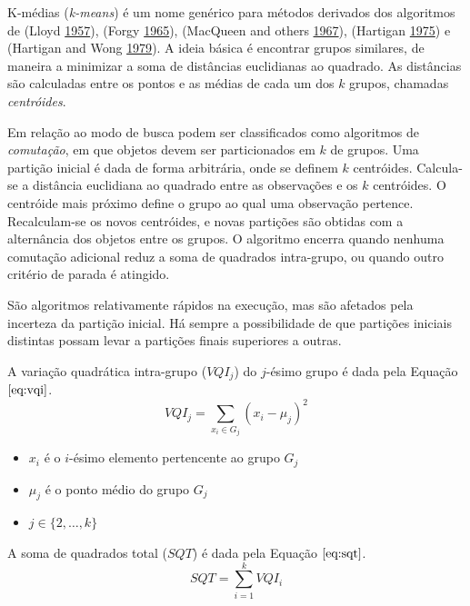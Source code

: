 \documentclass[
]{book}
\providecommand{\tightlist}{%
  \setlength{\itemsep}{0pt}\setlength{\parskip}{0pt}}
\theoremstyle{definition}
\theoremstyle{definition}
\theoremstyle{definition}
\theoremstyle{remark}
\begin{document}
K-médias (\emph{k-means}) é um nome genérico para métodos derivados dos algoritmos de (Lloyd \protect\hyperlink{ref-lloyd1982least}{1957}), (Forgy \protect\hyperlink{ref-forgy1965cluster}{1965}), (MacQueen and others \protect\hyperlink{ref-macqueen1967some}{1967}), (Hartigan \protect\hyperlink{ref-hartigan1975clustering}{1975}) e (Hartigan and Wong \protect\hyperlink{ref-hartigan1979algorithm}{1979}). A ideia básica é encontrar grupos similares, de maneira a minimizar a soma de distâncias euclidianas ao quadrado. As distâncias são calculadas entre os pontos e as médias de cada um dos \(k\) grupos, chamadas \emph{centróides}.

Em relação ao modo de busca podem ser classificados como algoritmos de \emph{comutação}, em que objetos devem ser particionados em \(k\) de grupos. Uma partição inicial é dada de forma arbitrária, onde se definem \(k\) centróides. Calcula-se a distância euclidiana ao quadrado entre as observações e os \(k\) centróides. O centróide mais próximo define o grupo ao qual uma observação pertence. Recalculam-se os novos centróides, e novas partições são obtidas com a alternância dos objetos entre os grupos. O algoritmo encerra quando nenhuma comutação adicional reduz a soma de quadrados intra-grupo, ou quando outro critério de parada é atingido.

São algoritmos relativamente rápidos na execução, mas são afetados pela incerteza da partição inicial. Há sempre a possibilidade de que partições iniciais distintas possam levar a partições finais superiores a outras.

A variação quadrática intra-grupo (\(VQI_{j}\)) do \(j\)-ésimo grupo é dada pela Equação \(\eqref{eq:vqi}\).
\begin{equation}
VQI_{j} = \sum_{x_i \in G_j} (x_i - \mu_j)^2
\label{eq:vqi}
\end{equation}

\begin{itemize}
\tightlist
\item
  \(x_i\) é o \(i\)-ésimo elemento pertencente ao grupo \(G_j\)\\
\item
  \(\mu_j\) é o ponto médio do grupo \(G_j\)\\
\item
  \(j \in \{2, \ldots, k\}\)
\end{itemize}

A soma de quadrados total (\(SQT\)) é dada pela Equação \(\eqref{eq:sqt}\).
\begin{equation}
SQT = \sum_{i=1}^{k} VQI_{i}
\label{eq:sqt}
\end{equation}
\end{document}
